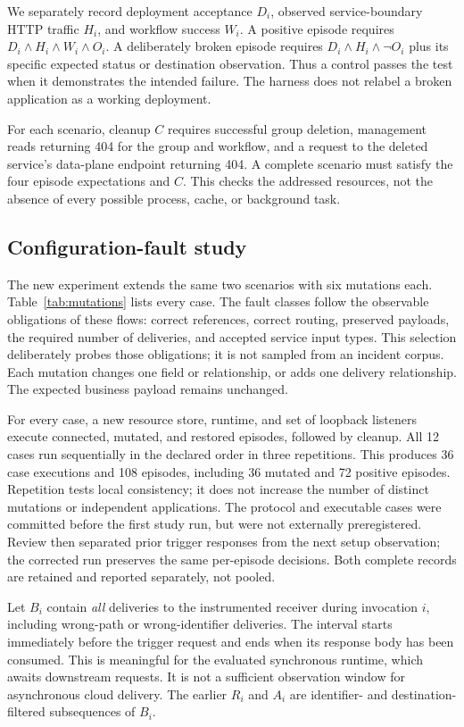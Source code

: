 \documentclass[10pt,a4paper]{article}
\begin{document}
We separately record deployment acceptance $D_i$, observed service-boundary HTTP traffic $H_i$, and workflow success $W_i$. A positive episode requires $D_i\land H_i\land W_i\land O_i$. A deliberately broken episode requires $D_i\land H_i\land\neg O_i$ plus its specific expected status or destination observation. Thus a control passes the test when it demonstrates the intended failure. The harness does not relabel a broken application as a working deployment.

For each scenario, cleanup $C$ requires successful group deletion, management reads returning 404 for the group and workflow, and a request to the deleted service's data-plane endpoint returning 404. A complete scenario must satisfy the four episode expectations and $C$. This checks the addressed resources, not the absence of every possible process, cache, or background task.

\subsection{Configuration-fault study}
The new experiment extends the same two scenarios with six mutations each. Table~\ref{tab:mutations} lists every case. The fault classes follow the observable obligations of these flows: correct references, correct routing, preserved payloads, the required number of deliveries, and accepted service input types. This selection deliberately probes those obligations; it is not sampled from an incident corpus. Each mutation changes one field or relationship, or adds one delivery relationship. The expected business payload remains unchanged.

For every case, a new resource store, runtime, and set of loopback listeners execute connected, mutated, and restored episodes, followed by cleanup. All 12 cases run sequentially in the declared order in three repetitions. This produces 36 case executions and 108 episodes, including 36 mutated and 72 positive episodes. Repetition tests local consistency; it does not increase the number of distinct mutations or independent applications. The protocol and executable cases were committed before the first study run, but were not externally preregistered. Review then separated prior trigger responses from the next setup observation; the corrected run preserves the same per-episode decisions. Both complete records are retained and reported separately, not pooled.

Let $B_i$ contain \emph{all} deliveries to the instrumented receiver during invocation $i$, including wrong-path or wrong-identifier deliveries. The interval starts immediately before the trigger request and ends when its response body has been consumed. This is meaningful for the evaluated synchronous runtime, which awaits downstream requests. It is not a sufficient observation window for asynchronous cloud delivery. The earlier $R_i$ and $A_i$ are identifier- and destination-filtered subsequences of $B_i$.
\end{document}
